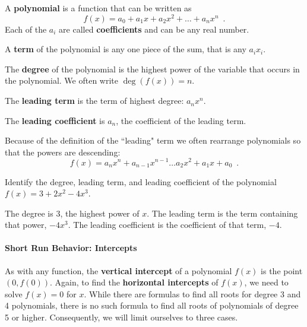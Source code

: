 \begin{definition}
A {\bf polynomial} is a function that can be written as
\[ f(x)=a_0+a_1 x+a_2 x^2+\ldots +a_n x^n \enspace . \]
Each of the $a_i$ are called {\bf coefficients} and can be any real number.

A {\bf term} of the polynomial is any one piece of the sum, that is any $a_ix_i$.

The {\bf degree} of the polynomial is the highest power of the variable that occurs in the polynomial. We often write $\deg(f(x)) = n$.

The {\bf leading term} is the term of highest degree: $a_n x^n$.

The {\bf leading coefficient} is $a_n$, the coefficient of the leading term.

Because of the definition of the ``leading" term we often rearrange polynomials so that the powers are descending:
\[ f(x)=a_n x^n+a_{n-1}x^{n-1}\dots a_2 x^2+a_1 x+a_0 \enspace .\]
\end{definition}
\begin{example}
Identify the degree, leading term, and leading coefficient of the polynomial $f(x)=3+2x^2-4x^3$.

\begin{solution} The degree is 3, the highest power of $x$. The leading term is the term containing that power, $-4x^3$. The leading coefficient is the coefficient of that term, $-4$.
\end{solution}\end{example}

\paragraph*{Short Run Behavior: Intercepts}
As with any function, the {\bf vertical intercept} of a polynomial $f(x)$ is the point $(0, f(0))$. Again, to find the {\bf horizontal intercepts} of $f(x)$, we need to solve $f(x)=0$ for $x$. While there are formulas to find all roots for degree 3 and 4 polynomials, there is no such formula to find all roots of polynomials of degree 5 or higher. Consequently, we will limit ourselves to three cases.

